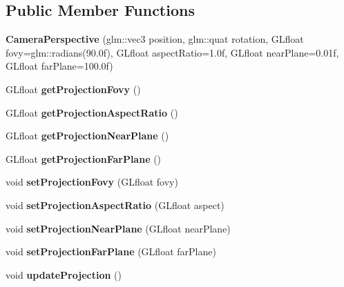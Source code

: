 \subsection*{Public Member Functions}
\begin{DoxyCompactItemize}
\item 
\mbox{\label{classflw_1_1flf_1_1CameraPerspective_a379b92a93d9f8466d1d3e79a90465fa7}} 
{\bfseries Camera\+Perspective} (glm\+::vec3 position, glm\+::quat rotation, G\+Lfloat fovy=glm\+::radians(90.\+0f), G\+Lfloat aspect\+Ratio=1.\+0f, G\+Lfloat near\+Plane=0.\+01f, G\+Lfloat far\+Plane=100.\+0f)
\item 
\mbox{\label{classflw_1_1flf_1_1CameraPerspective_a0d38106602938a2b5b03a6db214ebcc0}} 
G\+Lfloat {\bfseries get\+Projection\+Fovy} ()
\item 
\mbox{\label{classflw_1_1flf_1_1CameraPerspective_af49555679eb7d5a063643e30461d77ea}} 
G\+Lfloat {\bfseries get\+Projection\+Aspect\+Ratio} ()
\item 
\mbox{\label{classflw_1_1flf_1_1CameraPerspective_ada21a63b8ead93a93e3de416036d08b8}} 
G\+Lfloat {\bfseries get\+Projection\+Near\+Plane} ()
\item 
\mbox{\label{classflw_1_1flf_1_1CameraPerspective_a0b19db2aaa3b7bb44bfe0b204ef341f9}} 
G\+Lfloat {\bfseries get\+Projection\+Far\+Plane} ()
\item 
\mbox{\label{classflw_1_1flf_1_1CameraPerspective_a68c18d3c8ccd52fc48db96973e45b525}} 
void {\bfseries set\+Projection\+Fovy} (G\+Lfloat fovy)
\item 
\mbox{\label{classflw_1_1flf_1_1CameraPerspective_a19b54c2d676effb8e7b1986e4ddd5d7c}} 
void {\bfseries set\+Projection\+Aspect\+Ratio} (G\+Lfloat aspect)
\item 
\mbox{\label{classflw_1_1flf_1_1CameraPerspective_a7e7d41e82ede68c179646ab96ae93c1c}} 
void {\bfseries set\+Projection\+Near\+Plane} (G\+Lfloat near\+Plane)
\item 
\mbox{\label{classflw_1_1flf_1_1CameraPerspective_aed83834404ba2025de37207ab2453850}} 
void {\bfseries set\+Projection\+Far\+Plane} (G\+Lfloat far\+Plane)
\item 
\mbox{\label{classflw_1_1flf_1_1CameraPerspective_aca94b0f08121b76fe51d99d6685de097}} 
void {\bfseries update\+Projection} ()
\end{DoxyCompactItemize}
